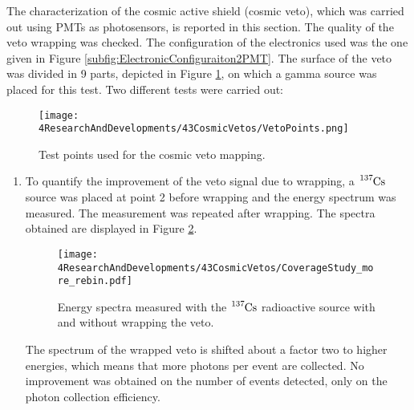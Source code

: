 The characterization of the cosmic active shield (cosmic veto), which was carried out using PMTs as photosensors, is reported in this section. The quality of the veto wrapping was checked. The configuration of the electronics used was the one given in Figure \ref{subfig:ElectronicConfiguraiton2PMT}. The surface of the veto was divided in 9 parts, depicted in Figure \ref{fig:MappingPoints}, on which a gamma source was placed for this test. Two different tests were carried out:

\begin{figure}[h]
\centering
\texttt{[image: 4ResearchAndDevelopments/43CosmicVetos/VetoPoints.png]}
\caption{Test points used for the cosmic veto mapping.\label{fig:MappingPoints}}
\end{figure}
\begin{enumerate}

\item{} To quantify the improvement of the veto signal due to wrapping, a $\ce{^{137}Cs}$ source was placed at point 2 before wrapping and the energy spectrum was measured. The measurement was repeated after wrapping. The spectra obtained are displayed in Figure \ref{fig:VetoCoverageImprovement}.

\begin{figure}[h]
\centering
\texttt{[image: 4ResearchAndDevelopments/43CosmicVetos/CoverageStudy\_more\_rebin.pdf]}
\caption{Energy spectra measured with the $\ce{^{137}Cs}$ radioactive source with and without wrapping the veto.\label{fig:VetoCoverageImprovement}}
\end{figure}

The spectrum of the wrapped veto is shifted about a factor two to higher energies, which means that more photons per event are collected. No improvement was obtained on the number of events detected, only on the photon collection efficiency.



\end{enumerate}
